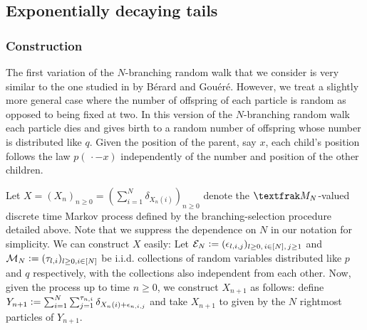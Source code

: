 \subsection{Exponentially decaying tails}
\subsubsection{Construction}

The first variation of the $N$-branching random walk that we consider is very similar to the one studied in \cite{exp_tails} by Bérard and Gouéré. However, we treat a slightly more general case where the number of offspring of each particle is random as opposed to being fixed at two. In this version of the $N$-branching random walk each particle dies and gives birth to a random number of offspring whose number is distributed like $q$. Given the position of the parent, say $x$, each child's position follows the law $p(\,\cdot - x)$ independently of the number and position of the other children. 

\begin{construction} Let $X = (X_n)_{n \geq 0} = (\sum_{i = 1}^N \delta_{X_n(i)})_{n \geq 0}$ denote the $\frak{M}_N$-valued discrete time Markov process defined by the branching-selection procedure detailed above. Note that we suppress the dependence on $N$ in our notation for simplicity. We can construct $X$ easily: Let $\mathcal{E}_N \vcentcolon= (\epsilon_{l, i, j})_{l \geq 0,\,i \in [N],\,j \geq 1}$ and $\mathcal{M}_N \vcentcolon= (\tau_{l, i})_{l \geq 0, i \in [N]}$ be i.i.d. collections of random variables distributed like $p$ and $q$ respectively, with the collections also independent from each other. Now, given the process up to time $n \geq 0$, we construct $X_{n+1}$ as follows: define $Y_{n+1} \vcentcolon= \sum_{i = 1}^N \sum_{j=1}^{\tau_{n, i}} \delta_{X_n(i) + \epsilon_{n, i, j}}$ and take $X_{n+1}$ to given by the $N$ rightmost particles of $Y_{n+1}$. 
\end{construction}

